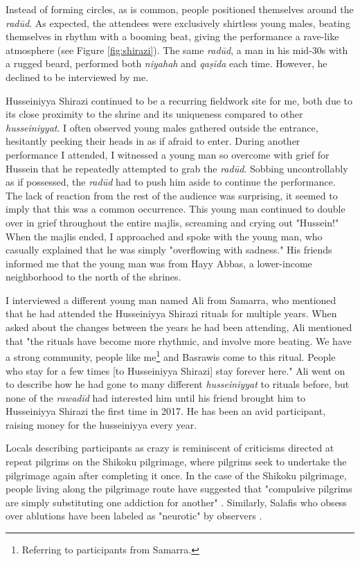 Instead of forming circles, as is common, people positioned themselves around the \emph{radūd}. As expected, the attendees were exclusively shirtless young males, beating themselves in rhythm with a booming beat, giving the performance a rave-like atmosphere (see Figure \ref{fig:shirazi}). The same \emph{radūd}, a man in his mid-30s with a rugged beard, performed both \emph{niyahah} and \emph{qaṣīda} each time. However, he declined to be interviewed by me.

Husseiniyya Shirazi continued to be a recurring fieldwork site for me, both due to its close proximity to the shrine and its uniqueness compared to other \emph{husseiniyyat}. I often observed young males gathered outside the entrance, hesitantly peeking their heads in as if afraid to enter. During another performance I attended, I witnessed a young man so overcome with grief for Hussein that he repeatedly attempted to grab the \emph{radūd}. Sobbing uncontrollably as if possessed, the \emph{radūd} had to push him aside to continue the performance. The lack of reaction from the rest of the audience was surprising, it seemed to imply that this was a common occurrence. This young man continued to double over in grief throughout the entire majlis, screaming and crying out "Hussein!" When the majlis ended, I approached and spoke with the young man, who casually explained that he was simply "overflowing with sadness." His friends informed me that the young man was from Hayy Abbas, a lower-income neighborhood to the north of the shrines.

I interviewed a different young man named Ali from Samarra, who mentioned that he had attended the Husseiniyya Shirazi rituals for multiple years. When asked about the changes between the years he had been attending, Ali mentioned that "the rituals have become more rhythmic, and involve more beating. We have a strong community, people like me\footnote{Referring to participants from Samarra.} and Basrawis come to this ritual. People who stay for a few times [to Husseiniyya Shirazi] stay forever here." Ali went on to describe how he had gone to many different \emph{husseiniyyat} to rituals before, but none of the \emph{rawadīd} had interested him until his friend brought him to Husseiniyya Shirazi the first time in 2017. He has been an avid participant, raising money for the husseiniyya every year. 

Locals describing participants as crazy is reminiscent of criticisms directed at repeat pilgrims on the Shikoku pilgrimage, where pilgrims seek to undertake the pilgrimage again after completing it once. In the case of the Shikoku pilgrimage, people living along the pilgrimage route have suggested that "compulsive pilgrims are simply substituting one addiction for another" \cite{reader_pilgrims_2021}. Similarly, Salafis who obsess over ablutions have been labeled as "neurotic" by observers \cite[67]{gauvain_salafi_2013}.

